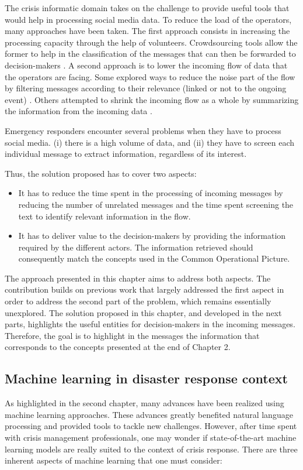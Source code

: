 The crisis informatic domain takes on the challenge to provide useful tools that would help in processing social media data.
To reduce the load of the operators, many approaches have been taken.
The first approach consists in increasing the processing capacity through the help of volunteers.
Crowdsourcing tools allow the former to help in the classification of the messages that can then be forwarded to decision-makers \parencite{imranAIDRArtificialIntelligence2014}.
A second approach is to lower the incoming flow of data that the operators are facing.
Some explored ways to reduce the noise part of the flow by filtering messages according to their relevance (linked or not to the ongoing event) \parencite{carageaClassifyingTextMessages2011,imranAIDRArtificialIntelligence2014}.
Others attempted to shrink the incoming flow as a whole by summarizing the information from the incoming data \parencite{rudraSummarizingSituationalTweets2016}.

Emergency responders encounter several problems when they have to process social media.
(i) there is a high volume of data, and (ii) they have to screen each individual message
to extract information, regardless of its interest.

Thus, the solution proposed has to cover two aspects:
\begin{itemize}
    \item It has to reduce the time spent in the processing of incoming messages by reducing the number of unrelated messages and the time spent screening the text to identify relevant information in the flow.
    \item It has to deliver value to the decision-makers by providing the information required by the different actors. The information retrieved should consequently match the concepts used in the Common Operational Picture.
\end{itemize}

The approach presented in this chapter aims to address both aspects.
The contribution builds on previous work that largely addressed the first aspect in
order to address the second part of the problem, which remains essentially unexplored.
The solution proposed in this chapter, and developed in the next parts, highlights the useful entities for decision-makers in the incoming messages.
Therefore, the goal is to highlight in the messages the information that corresponds to
the concepts presented at the end of Chapter 2.

\subsection{Machine learning in disaster response context}
As highlighted in the second chapter, many advances have been realized using machine learning approaches.
These advances greatly benefited natural language processing and provided tools to tackle
new challenges.
However, after time spent with crisis management professionals, one may wonder if
state-of-the-art machine learning models are really suited to the context of crisis response.
There are three inherent aspects of machine learning that one must consider:

